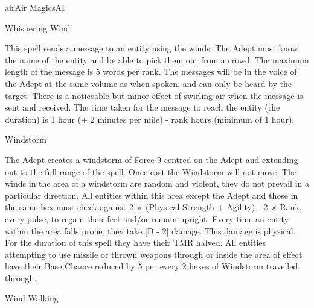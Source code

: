 \begin{College}[2.1]{air}{Air Magics}{AI}
\begin{spell}[S-15]{Whispering Wind}

\begin{effects}
This spell sends a message to an entity using the winds. The Adept
must know the name of the entity and be able to pick them out from a
crowd.  The maximum length of the message is 5 words per rank. The
messages will be in the voice of the Adept at the same volume as when
spoken, and can only be heard by the target.  There is a noticeable
but minor effect of swirling air when the message is sent and
received.  The time taken for the message to reach the entity (the
duration) is 1 hour (+ 2 minutes per mile) - rank hours (minimum of 1
hour).
\end{effects}
\end{spell}

\begin{spell}[S-16]{Windstorm}

\begin{effects}
The Adept creates a windstorm of Force 9 centred on the Adept and
extending out to the full range of the spell.  Once cast the Windstorm
will not move. The winds in the area of a windstorm are random and
violent, they do not prevail in a particular direction. All entities
within this area except the Adept and those in the same hex must check
against 2 × (Physical Strength + Agility) - 2 × Rank, every pulse, to
regain their feet and/or remain upright. Every time an entity within
the area falls prone, they take [D - 2] damage. This damage is
physical.  For the duration of this spell they have their TMR halved.
All entities attempting to use missile or thrown weapons through or
inside the area of effect have their Base Chance reduced by 5 per
every 2 hexes of Windstorm travelled through.
\end{effects}
\end{spell}

\begin{spell}[S-17]{Wind Walking}


\end{spell}
\end{College}
